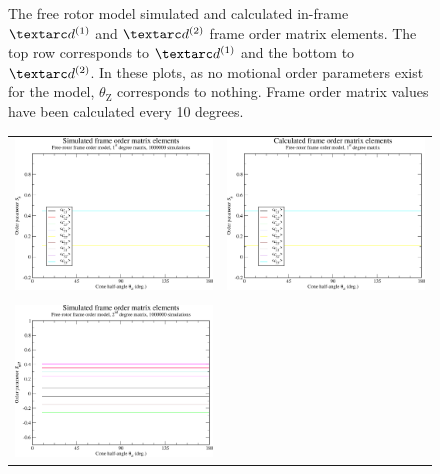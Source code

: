 \begin{figure}
\begin{tabular}{@{}cc@{}}
  \end{tabular}
  \caption[Free rotor simulated and calculated in-frame Daeg$^{(1)}$ and Daeg$^{(2)}$ elements.]{
    The free rotor model simulated and calculated in-frame $\FOone$ and $\FOtwo$ frame order matrix elements.
    The top row corresponds to $\FOone$ and the bottom to $\FOtwo$.
    In these plots, as no motional order parameters exist for the model, $\theta_\textrm{Z}$ corresponds to nothing.
    Frame order matrix values have been calculated every 10 degrees.
  }
  \label{fig: simulated and calculated in-frame 1st and 2nd degree free rotor frame order}
\end{figure}

\begin{figure}
\centering
  \begin{tabular}{@{}cc@{}}
    \includegraphics[width=.5\textwidth]{images/frame_order_matrix/Sij_free_rotor_out_of_frame_theta_z_ens1000000.eps} &
    \includegraphics[width=.5\textwidth]{images/frame_order_matrix/Sij_free_rotor_out_of_frame_theta_z_calc.eps} \\
    \\[-5pt]
    \includegraphics[width=.5\textwidth]{images/frame_order_matrix/Sijkl_free_rotor_out_of_frame_theta_z_ens1000000.eps} &

\end{tabular}
\end{figure}
